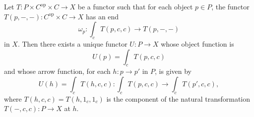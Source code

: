 Let $T: P \times C^{\mathrm{op}} \times C \rightarrow X$ be a functor such that for each object $p \in P$, the functor $T(p, -, -): C^{\mathrm{op}} \times C \rightarrow X$ has an end
\[
\omega_p: \int_c T(p, c, c) \rightarrow T(p, -, -)
\]
in $X$. Then there exists a unique functor $U: P \rightarrow X$ whose object function is
\[
U(p) = \int_c T(p, c, c)
\]
and whose arrow function, for each $h: p \rightarrow p'$ in $P$, is given by
\[
U(h) = \int_c T(h, c, c): \int_c T(p, c, c) \rightarrow \int_c T(p', c, c),
\]
where $T(h, c, c) = T(h, 1_c, 1_c)$ is the component of the natural transformation $T(-, c, c): P \rightarrow X$ at $h$.
